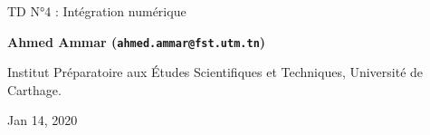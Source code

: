 \documentclass[%
oneside,                 %
final,                   %
10pt,french]{article}
\begin{document}

\newcommand{\exercisesection}[1]{\subsection*{#1}}






\thispagestyle{empty}

\begin{center}
{\LARGE\bf
\begin{spacing}{1.25}
TD N°4 : Intégration numérique
\end{spacing}
}
\end{center}


\begin{center}
{\bf Ahmed Ammar (\texttt{ahmed.ammar@fst.utm.tn})}
\end{center}

    \begin{center}
\centerline{{\small Institut Préparatoire aux Études Scientifiques et Techniques, Université de Carthage.}}
\end{center}
    

\begin{center}
Jan 14, 2020
\end{center}

\vspace{1cm}


\tableofcontents


\vspace{1cm} %




\end{document}
